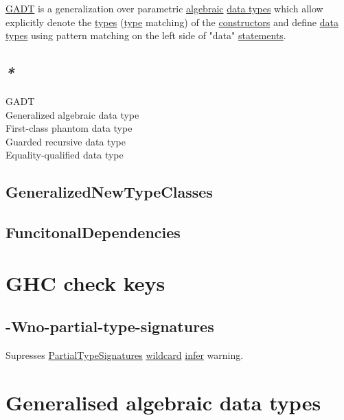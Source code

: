 \documentclass[a4paper,14pt,oneside]{book}
\begin{document}
\hyperref[orge0a0a40]{GADT} is a generalization over parametric \hyperref[orga42386a]{algebraic} \hyperref[org6ad0f56]{data types} which allow explicitly denote the \hyperref[org9e7edc9]{types} (\hyperref[orgd6db20c]{type} matching) of the \hyperref[orgf630dac]{constructors} and define \hyperref[org6ad0f56]{data types} using pattern matching on the left side of "data" \hyperref[org1db31d8]{statements}.\\

\section{\emph{*}}
\label{sec:orga835ed9}

\label{orge0a0a40}GADT\\
\label{org2a6a19e}Generalized algebraic data type\\
\label{org86bde90}First-class phantom data type\\
\label{org9be6b2e}Guarded recursive data type\\
\label{orgc88f2bc}Equality-qualified data type\\

\section{\label{org31746f8}GeneralizedNewTypeClasses}
\label{sec:org3200b44}

\section{\label{org78904b8}FuncitonalDependencies}
\label{sec:orgc277e30}

\chapter{\label{orgae9ee36}GHC check keys}
\label{sec:orgb381749}

\section{\label{orge1e6acf}-Wno-partial-type-signatures}
\label{sec:org165dbf4}

Supresses \hyperref[orge9378df]{PartialTypeSignatures} \hyperref[org1fba691]{wildcard} \hyperref[org4ee69cd]{infer} warning.\\

\chapter{\label{orgb0cfefd}Generalised algebraic data types}
\label{sec:orge3295e6}
\end{document}
